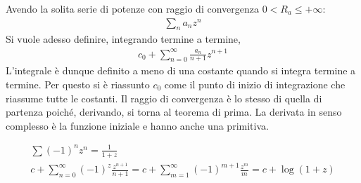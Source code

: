 \documentclass[a4paper, oneside]{article}
\begin{document}
\begin{theorem}
    Avendo la solita serie di potenze con raggio di convergenza $0 < R_a \leq + \infty$:
    \begin{gather*}
        \sum_{n }^{} a_n z^{n}
    \end{gather*}
    Si vuole adesso definire, integrando termine a termine, 
    \begin{gather*}
        c_0 + \sum_{n = 0}^{\infty } \frac{a_n}{n + 1}z^{n + 1}  
    \end{gather*}
    L'integrale è dunque definito a meno di una costante quando 
    si integra termine a termine. Per questo si è riassunto $c_0$ come 
    il punto di inizio di integrazione che riassume tutte le costanti.
    Il raggio di convergenza è lo stesso di quella di partenza poiché, derivando,
    si torna al teorema di prima. La derivata in senso complesso è la funzione iniziale e 
    hanno anche una primitiva.
\end{theorem}
\begin{example}
\begin{gather*}
    \sum (-1)^{n}z^{n} = \frac{1}{1 + z}  \\
    c + \sum_{n = 0}^{\infty } (-1)^{z} \frac{z^{n + 1}}{n + 1} = c + \sum_{m = 1}^{\infty } (-1)^{m + 1} \frac{z^{m}}{m} = c + \log(1 + z) 
\end{gather*}
\end{example}
\end{document}
